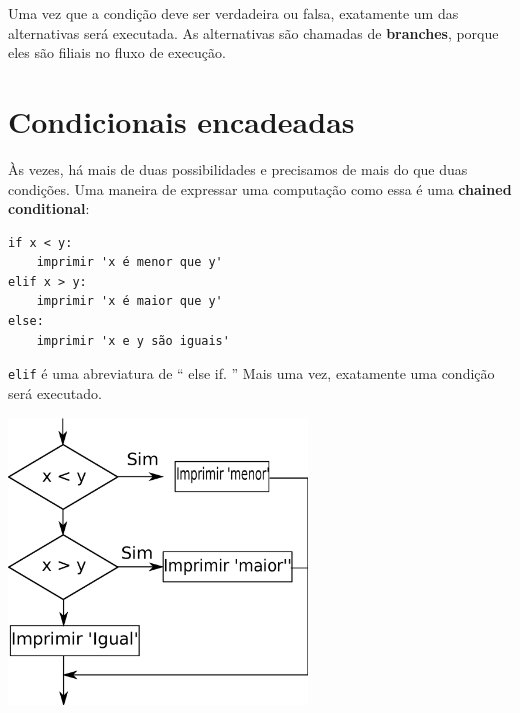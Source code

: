 Uma vez que a condição deve ser verdadeira ou falsa, exatamente um das
alternativas será executada. As alternativas são chamadas de
{\bf branches}, porque eles são filiais no fluxo de execução.




\section{Condicionais encadeadas}


Às vezes, há mais de duas possibilidades e precisamos de mais do que
duas condições. Uma maneira de expressar uma computação como essa é uma {\bf
chained conditional}:

\beforeverb
\begin{verbatim}
if x < y:
    imprimir 'x é menor que y'
elif x > y:
    imprimir 'x é maior que y'
else:
    imprimir 'x e y são iguais'
\end{verbatim}
\afterverb
\afterverb
%

{\tt elif} é uma abreviatura de `` else if. '' Mais uma vez, exatamente uma
condição será executado.

\beforefig
\centerline{\includegraphics[height=3.00in]{figs2/elif.eps}}
\afterfig


